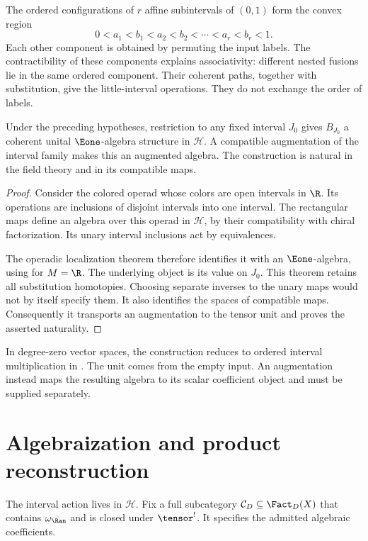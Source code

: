The ordered configurations of $r$ affine subintervals of $(0,1)$
form the convex region
\[
 0<a_1<b_1<a_2<b_2<\cdots<a_r<b_r<1.
\]
Each other component is obtained by permuting the input labels.
The contractibility of these components explains associativity:
different nested fusions lie in the same ordered component.
Their coherent paths, together with substitution, give the
little-interval operations. They do not exchange the order of labels.

\begin{proposition}
\label{cbc:ord:interval}
Under the preceding hypotheses, restriction to any fixed interval
$J_0$ gives $B_{J_0}$ a coherent unital $\Eone$-algebra structure
in $\mathcal H$.
A compatible augmentation of the interval family makes this an
augmented algebra.
The construction is natural in the field theory and in its
compatible maps.
\end{proposition}
\begin{proof}
Consider the colored operad whose colors are open intervals in $\R$.
Its operations are inclusions of disjoint intervals into one interval.
The rectangular maps define an algebra over this operad in
$\mathcal H$, by their compatibility with chiral factorization.
Its unary interval inclusions act by equivalences.

The operadic localization theorem
\cite[Theorem 5.4.5.9]{LurieHA} therefore identifies it with an
$\Eone$-algebra, using
\cite[Example 5.4.5.3]{LurieHA} for $M=\R$.
The underlying object is its value on $J_0$.
This theorem retains all substitution homotopies. Choosing separate
inverses to the unary maps would not by itself specify them.
It also identifies the spaces of compatible maps.
Consequently it transports an augmentation to the tensor unit
and proves the asserted naturality.
\end{proof}

In degree-zero vector spaces, the construction reduces to ordered
interval multiplication in \cite[2014 preprint, \S3.2]{CG1}.
The unit comes from the empty input.
An augmentation instead maps the resulting algebra to its scalar
coefficient object and must be supplied separately.

\section{Algebraization and product reconstruction}
The interval action lives in $\mathcal H$.
Fix a full subcategory $\mathcal C_D\subseteq\Fact_D(X)$ that
contains $\omega_{\Ran}$ and is closed under $\tensor^!$.
It specifies the admitted algebraic coefficients.

